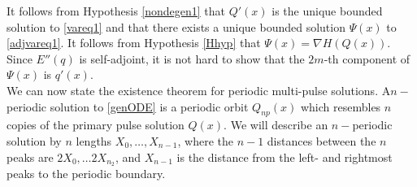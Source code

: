 \documentclass[12pt]{article}
\def\R{{\mathbb R}}
\begin{document}
It follows from Hypothesis \ref{nondegen1} that $Q'(x)$ is the unique bounded solution to \eqref{vareq1} and that there exists a unique bounded solution $\Psi(x)$ to \eqref{adjvareq1}. It follows from Hypothesis \ref{Hhyp} that $\Psi(x) = \nabla H(Q(x))$. Since $E''(q)$ is self-adjoint, it is not hard to show that the $2m$-th component of $\Psi(x)$ is $q'(x)$.\\






We can now state the existence theorem for periodic multi-pulse solutions. A$n-$periodic solution to \eqref{genODE} is a periodic orbit $Q_{np}(x)$ which resembles $n$ copies of the primary pulse solution $Q(x)$. We will describe an $n-$periodic solution by $n$ lengths $X_0, \dots, X_{n-1}$, where the $n-1$ distances between the $n$ peaks are $2X_0, \dots 2X_{n_2}$, and $X_{n-1}$ is the distance from the left- and rightmost peaks to the periodic boundary.
\end{document}
